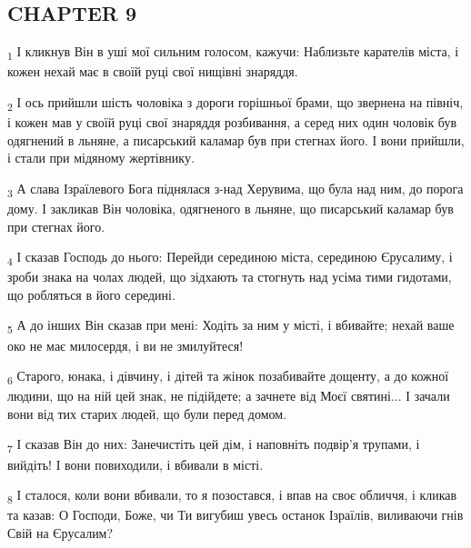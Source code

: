 \subsection{CHAPTER 9}
\begin{tcolorbox}
\textsubscript{1} І кликнув Він в уші мої сильним голосом, кажучи: Наблизьте карателів міста, і кожен нехай має в своїй руці свої нищівні знаряддя.
\end{tcolorbox}
\begin{tcolorbox}
\textsubscript{2} І ось прийшли шість чоловіка з дороги горішньої брами, що звернена на північ, і кожен мав у своїй руці свої знаряддя розбивання, а серед них один чоловік був одягнений в льняне, а писарський каламар був при стегнах його. І вони прийшли, і стали при мідяному жертівнику.
\end{tcolorbox}
\begin{tcolorbox}
\textsubscript{3} А слава Ізраїлевого Бога піднялася з-над Херувима, що була над ним, до порога дому. І закликав Він чоловіка, одягненого в льняне, що писарський каламар був при стегнах його.
\end{tcolorbox}
\begin{tcolorbox}
\textsubscript{4} І сказав Господь до нього: Перейди серединою міста, серединою Єрусалиму, і зроби знака на чолах людей, що зідхають та стогнуть над усіма тими гидотами, що робляться в його середині.
\end{tcolorbox}
\begin{tcolorbox}
\textsubscript{5} А до інших Він сказав при мені: Ходіть за ним у місті, і вбивайте; нехай ваше око не має милосердя, і ви не змилуйтеся!
\end{tcolorbox}
\begin{tcolorbox}
\textsubscript{6} Старого, юнака, і дівчину, і дітей та жінок позабивайте дощенту, а до кожної людини, що на ній цей знак, не підійдете; а зачнете від Моєї святині... І зачали вони від тих старих людей, що були перед домом.
\end{tcolorbox}
\begin{tcolorbox}
\textsubscript{7} І сказав Він до них: Занечистіть цей дім, і наповніть подвір'я трупами, і вийдіть! І вони повиходили, і вбивали в місті.
\end{tcolorbox}
\begin{tcolorbox}
\textsubscript{8} І сталося, коли вони вбивали, то я позостався, і впав на своє обличчя, і кликав та казав: О Господи, Боже, чи Ти вигубиш увесь останок Ізраїлів, виливаючи гнів Свій на Єрусалим?
\end{tcolorbox}

